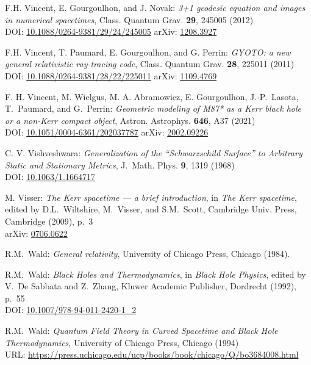 \begin{thebibliography}{123}
F.H. Vincent, E. Gourgoulhon, and J. Novak:
{\em 3+1 geodesic equation and images in numerical spacetimes},
Class. Quantum Grav. {\bf 29}, 245005 (2012)\\
DOI: \href{https://doi.org/10.1088/0264-9381/29/24/245005}{10.1088/0264-9381/29/24/245005}\hfill
arXiv: \href{https://arxiv.org/abs/1208.3927}{1208.3927}

F.H. Vincent, T. Paumard, E. Gourgoulhon, and G. Perrin:
{\em GYOTO: a new general relativistic ray-tracing code},
Class. Quantum Grav. {\bf 28}, 225011 (2011)\\
DOI: \href{https://doi.org/10.1088/0264-9381/28/22/225011}{10.1088/0264-9381/28/22/225011}
\hfill
arXiv: \href{https://arxiv.org/abs/1109.4769}{1109.4769}

F. H. Vincent, M. Wielgus, M. A. Abramowicz, E. Gourgoulhon, J.-P.~Lasota, T.~Paumard,
and G.~Perrin:
{\em Geometric modeling of M87* as a Kerr black hole or a non-Kerr compact object},
Astron. Astrophys. {\bf 646}, A37 (2021)\\
DOI: \href{https://doi.org/10.1051/0004-6361/202037787}{10.1051/0004-6361/202037787}\hfill
arXiv: \href{https://arxiv.org/abs/2002.09226}{2002.09226}

C. V. Vishveshwara:
{\em Generalization of the ``Schwarzschild Surface'' to Arbitrary Static and Stationary Metrics},
J.~Math. Phys. {\bf 9}, 1319 (1968)\\
DOI: \href{https://doi.org/10.1063/1.1664717}{10.1063/1.1664717}

M. Visser: {\em The Kerr spacetime --- a brief introduction},
in {\em The Kerr spacetime}, edited by D.L.~Wiltshire, M.~Visser, and S.M.~Scott,
Cambridge Univ. Press, Cambridge (2009), p.~3\\
arXiv: \href{https://arxiv.org/abs/0706.0622}{0706.0622}

R.M.~Wald:
{\em General relativity},
University of Chicago Press, Chicago (1984).

R.M.~Wald:
{\em Black Holes and Thermodynamics},
in {\em Black Hole Physics}, edited by V.~De Sabbata and Z.~Zhang,
Kluwer Academic Publisher, Dordrecht (1992), p.~55\\
DOI: \href{https://doi.org/10.1007/978-94-011-2420-1_2}{10.1007/978-94-011-2420-1\_2}

R.M.~Wald:
{\em Quantum Field Theory in Curved Spacetime and Black Hole Thermodynamics},
University of Chicago Press, Chicago (1994)\\
URL: \url{https://press.uchicago.edu/ucp/books/book/chicago/Q/bo3684008.html}


\end{thebibliography}
